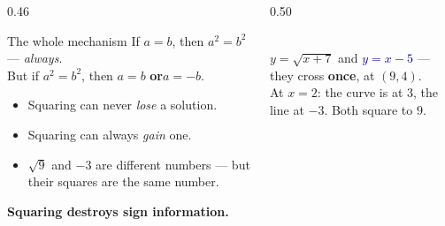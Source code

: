 \documentclass[aspectratio=169, 11pt]{beamer}
\newcommand{\lgrid}[4]{%
  \draw[step=1, linegray!45, thin] (#1,#3) grid (#2,#4);
  \draw[->, thick, charcoal] (#1,0)--(#2,0) node[below right, font=\tiny]{$x$};
  \draw[->, thick, charcoal] (0,#3)--(0,#4) node[left, font=\tiny]{$y$};}
\begin{document}
\begin{frame}[t, plain]
  \begin{columns}[T]
    \begin{column}{0.46\textwidth}
      \footnotesize
      \begin{block}{The whole mechanism}
        If $a=b$, then $a^{2}=b^{2}$ --- \emph{always}. \\[4pt]
        But if $a^{2}=b^{2}$, then $a=b$ \quad\textbf{or}\quad $a=-b$.
      \end{block}
      \vspace{3pt}
      \begin{itemize}\setlength{\itemsep}{3pt}
        \item Squaring can never \emph{lose} a solution.
        \item Squaring can always \emph{gain} one.
        \item $\sqrt9$ and $-3$ are different numbers --- but their squares are the same number.
      \end{itemize}
      \vspace{3pt}
      \begin{center}
      \textbf{Squaring destroys sign information.}
      \end{center}
    \end{column}
    \begin{column}{0.50\textwidth}
      \centering
      \\[2pt]
      {\scriptsize \textcolor{forest}{$y=\sqrt{x+7}$} \; and \; \textcolor{navy}{$y=x-5$} --- they
      cross \textbf{once}, at $(9,4)$. \\
      At $x=2$: the curve is at $3$, the line at $-3$. Both square to $9$.}
    \end{column}
  \end{columns}
\end{frame}
\end{document}
